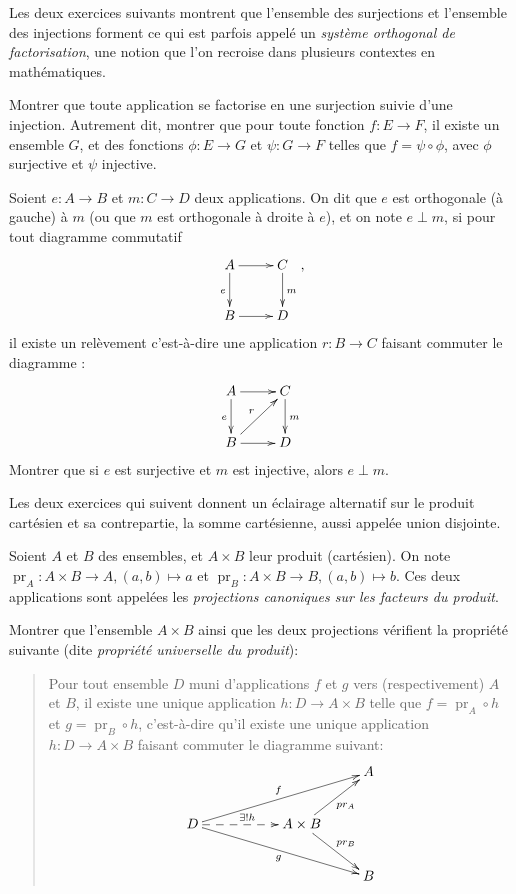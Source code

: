 


Les deux exercices suivants montrent que l'ensemble des surjections et l'ensemble des injections forment ce qui est parfois appelé un \emph{système orthogonal de factorisation}, une notion que l'on recroise dans plusieurs contextes en mathématiques.

\begin{exercice}
Montrer que toute application se factorise en une surjection suivie d'une injection. Autrement dit, montrer que pour toute fonction $f : E\to F$, il existe un ensemble $G$, et des fonctions $\phi : E\to G$ et $\psi : G\to F$ telles que $f = \psi\circ \phi$, avec $\phi$ surjective et $\psi$ injective.
\end{exercice}

\begin{exercice}
Soient $e : A\to B$ et $m : C\to D$ deux applications. On dit que $e$ est orthogonale (à gauche) à $m$ (ou que $m$ est orthogonale à droite à $e$), et on note $e\perp m$, si pour tout diagramme commutatif
\[
\xymatrix{
A \ar[r] \ar[d]_{e}& C\ar[d]^{m}\\
B \ar[r]& D 
},
\]
il existe un relèvement c'est-à-dire une application $r : B\to C$ faisant commuter le diagramme :
\[
\xymatrix{
A \ar[r] \ar[d]_{e}& C\ar[d]^{m}\\
B \ar[r]\ar[ur]^{r}& D 
}
\]
Montrer que si $e$ est surjective et $m$ est injective, alors $e\perp m$.
\end{exercice}

Les deux exercices qui suivent donnent un éclairage alternatif sur le produit cartésien et sa contrepartie, la \og somme cartésienne\og{}, aussi appelée \og union disjointe\fg.

\begin{exercice}
Soient $A$ et $B$ des ensembles, et $ A\times B$ leur produit (cartésien). On note $\operatorname{pr}_A : A\times B \to A, (a,b)\mapsto a$ et $\operatorname{pr}_B : A\times B \to B, (a,b)\mapsto b$. Ces deux applications sont appelées les \emph{projections canoniques sur les facteurs du produit}.

Montrer que l'ensemble $A\times B$ ainsi que les deux projections vérifient la propriété suivante (dite \emph{propriété universelle du produit}):
\begin{quote}
Pour tout ensemble $D$ muni d'applications $f$ et $g$ vers (respectivement) $A$ et $B$, il existe une unique application $h : D\to A\times B$ telle que $f =\operatorname{pr}_A \circ  h$ et $g =\operatorname{pr}_B \circ  h$, c'est-à-dire qu'il existe une unique application $h : D\to A\times B$ faisant commuter le diagramme suivant:
\[ 
\xymatrix{
& & & A\\
D \ar@{-->}[rr]^{\exists !h} \ar[urrr]^{f} \ar[drrr]_{g} & & A\times B \ar[ur]_{pr_A} \ar[dr]^{pr_B}& \\
& & & B
}\]
\end{quote}
\end{exercice}

